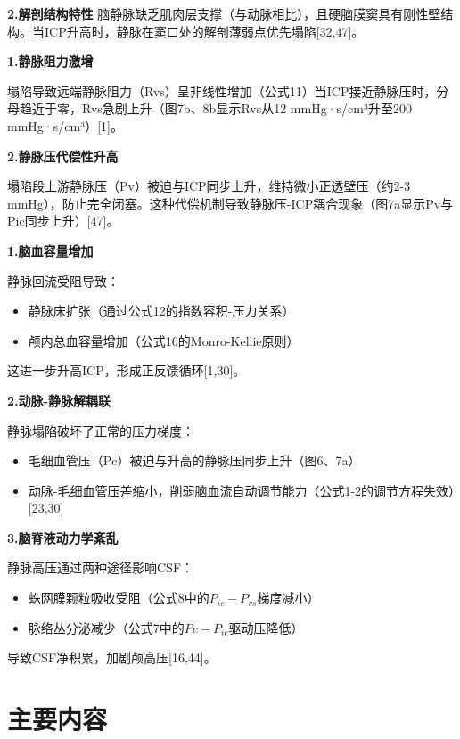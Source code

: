 \documentclass[12pt]{article}
\begin{document}
\noindent \textbf{2.解剖结构特性}
脑静脉缺乏肌肉层支撑（与动脉相比），且硬脑膜窦具有刚性壁结构。当ICP升高时，静脉在窦口处的解剖薄弱点优先塌陷[32,47]。



\noindent \textbf{1.静脉阻力激增}

塌陷导致远端静脉阻力（Rvs）呈非线性增加（公式11）当ICP接近静脉压时，分母趋近于零，Rvs急剧上升（图7b、8b显示Rvs从12 mmHg·s/cm³升至200 mmHg·s/cm³）[1]。

\noindent \textbf{2.静脉压代偿性升高}

塌陷段上游静脉压（Pv）被迫与ICP同步上升，维持微小正透壁压（约2-3 mmHg），防止完全闭塞。这种代偿机制导致静脉压-ICP耦合现象（图7a显示Pv与Pic同步上升）[47]。


\noindent \textbf{1.脑血容量增加}

静脉回流受阻导致：
\begin{itemize}
    \item 静脉床扩张（通过公式12的指数容积-压力关系）
    \item 颅内总血容量增加（公式16的Monro-Kellie原则）
\end{itemize}

这进一步升高ICP，形成正反馈循环[1,30]。

\noindent \textbf{2.动脉-静脉解耦联}

静脉塌陷破坏了正常的压力梯度：
\begin{itemize}
    \item 毛细血管压（Pc）被迫与升高的静脉压同步上升（图6、7a）
    \item 动脉-毛细血管压差缩小，削弱脑血流自动调节能力（公式1-2的调节方程失效）[23,30]
\end{itemize}

\noindent \textbf{3.脑脊液动力学紊乱}

静脉高压通过两种途径影响CSF：
\begin{itemize}
    \item 蛛网膜颗粒吸收受阻（公式8中的$P_{ic}-P_{vs}$梯度减小）
    \item 脉络丛分泌减少（公式7中的$Pc-P_{ic}$驱动压降低）
\end{itemize}

导致CSF净积累，加剧颅高压[16,44]。


\section{主要内容}
\end{document}
